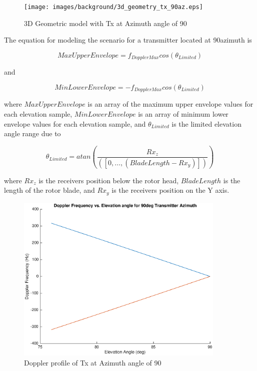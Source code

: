 \begin{figure}
	\begin{center}
		\texttt{[image: images/background/3d\_geometry\_tx\_90az.eps]}
		\caption{3D Geometric model with Tx at Azimuth angle of 90\textdegree}
		\label{fig:3D_model_90az}
	\end{center}
\end{figure}

The equation for modeling the scenario for a transmitter located at 90\textdegree \space azimuth is

\begin{equation}
	MaxUpperEnvelope = f_{DopplerMax}cos(\theta_{Limited})
	\label{eq:theory_90_upper}
\end{equation}

and

\begin{equation}
	MinLowerEnvelope = -f_{DopplerMax}cos(\theta_{Limited})
	\label{eq:theory_90_lower}
\end{equation}

where $MaxUpperEnvelope$ is an array of the maximum upper envelope values for each elevation sample, $MinLowerEnvelope$ is an array of minimum lower envelope values for each elevation sample, and $\theta_{Limited}$ is the limited elevation angle range due to 

\begin{equation}
	\theta_{Limited} = atan\left(\frac{Rx_z}{([0,\dots, (BladeLength - Rx_y)])}\right)
	\label{eq:theory_90_limited}
\end{equation}

where $Rx_z$ is the receivers position below the rotor head, $BladeLength$ is the length of the rotor blade, and $Rx_y$ is the receivers position on the Y axis.

\begin{figure}
	\begin{center}
		\includegraphics[width=10cm]{images/background/3d_geometry_tx_90az_doppler_profile.eps}
		\caption{Doppler profile of Tx at Azimuth angle of 90\textdegree}
		\label{fig:3D_model_90az_doppler}
	\end{center}
\end{figure}

